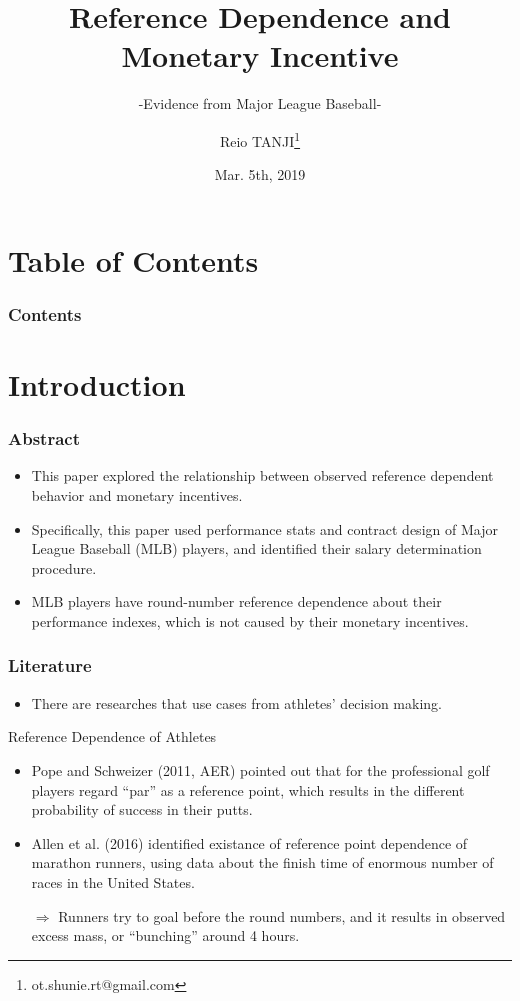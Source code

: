 \documentclass[dvipdfmx,12pt]{beamer}
\title{Reference Dependence and \\ Monetary Incentive}
\subtitle{-Evidence from Major League Baseball-}
\author{Reio TANJI\footnote{ot.shunie.rt@gmail.com} }
\date{Mar. 5th, 2019}
\institute{Osaka University, Graduate Scool of Economics}
\begin{document}
\begin{frame}\frametitle{}
  \titlepage
\end{frame}

\section*{Table of Contents}
\begin{frame}\frametitle{Contents}
  \tableofcontents
\end{frame}

\section{Introduction}

\begin{frame}\frametitle{Abstract}
  \begin{itemize}
    \item This paper explored the relationship between observed reference dependent behavior and monetary incentives.

    \item Specifically, this paper used performance stats and contract design of Major League Baseball (MLB) players, and identified their salary determination procedure.

    \item MLB players have round-number reference dependence about their performance indexes, which is not caused by their monetary incentives.

  \end{itemize}
\end{frame}

\begin{frame}\frametitle{Literature}
  \begin{itemize}
    \item There are researches that use cases from athletes' decision making.
  \end{itemize}

    \begin{block}{Reference Dependence of Athletes}
      \begin{itemize}
        \small
        \item Pope and Schweizer (2011, AER) pointed out that for the professional golf players regard ``par'' as a reference point, which results in the different probability of success in their putts.

        \item Allen et al. (2016) identified existance of reference point dependence of marathon runners, using data about the finish time of enormous number of races in the United States.

        $\Rightarrow$ Runners try to goal before the round numbers, and it results in observed excess mass, or ``bunching'' around 4 hours.

      \end{itemize}
    \end{block}
\end{frame}
\end{document}
